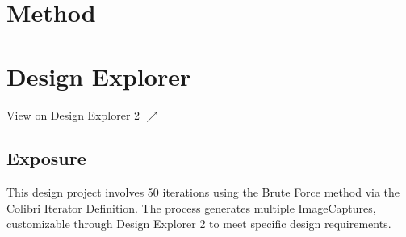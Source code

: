 \section*{
  Method
 }
\vfill

\vspace*{\fill}
\columnbreak%
\noindent
\begin{minipage}[t]{0.5\linewidth}
	\section*{
	  Design Explorer
	 }
\end{minipage}%
\begin{minipage}[t]{0.5\linewidth}
	\raggedleft
	\href{https://tt-acm.github.io/DesignExplorer/?ID=aHR0cHM6Ly9yYXcuZ2l0aHVidXNlcmNvbnRlbnQuY29tL2Fybm90dGZlcmVscy9jb2xpYnJpL3JlZnMvaGVhZHMvbWFpbi8=}{\textnormal{View on Design Explorer 2} $\nearrow$}
\end{minipage}
\vfill

\vspace{0pt}%
\raggedleft
\begin{tcolorbox}[SectionExposure, width=0.96\linewidth]%
	\vspace{0.5cm}%
	\subsection*{Exposure}
	\vspace*{-\baselineskip}%
	
	This design project involves 50 iterations using the Brute Force method via the Colibri Iterator Definition. The process generates multiple ImageCaptures, customizable through Design Explorer 2 to meet specific design requirements.
\end{tcolorbox}
\vfill
\EndTwoColumnLayout
\newpage
